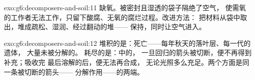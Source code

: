 \begin{solution}{exo:g6:decomposers-and-soil:11}
缺氧。被密封且湿透的袋子隔绝了空气，
使需氧的工作者无法工作，只留下酸腐、无氧的腐烂过程。改进方法：
把材料从袋中取出，堆成疏松、湿润、经过翻动的堆——
保持，同时让空气进入。
\end{solution}

\begin{solution}{exo:g6:decomposers-and-soil:12}
堆积的是：死亡——每年秋天的落叶层、每一代的遗体，
大量未被分解的。
耗尽的是：中的，
一旦回归的箭头被切断，便不再得到补充；吸收完
最后溶解的后，便无法再合成，
无论光照多么充足。两个方面是同一条被切断的箭头——
分解作用——的两端。
\end{solution}

